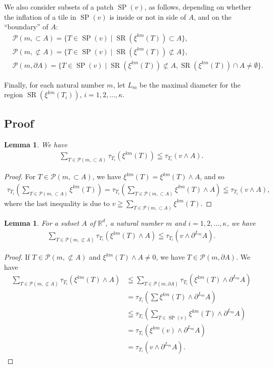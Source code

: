 \documentclass[a4]{amsart}
\DeclareMathOperator{\SP}{SP}
\DeclareMathOperator{\SR}{SR}
\newcommand{\sci}{\wedge}
\newtheorem{lem}[theorem]{Lemma}
\theoremstyle{definition}
\begin{document}
We also consider subsets of  a patch $\SP(v)$, as follows, depending on whether the inflation
of a tile in $\SP(v)$ is inside or not in side of $A$, and on the  ``boundary'' of $A$:
\begin{align*}
 &\mathcal{P}(m,\subset A)=\{T\in\SP(v)\mid \SR(\xi^{km}(T))\subset A\},\\
& \mathcal{P}(m,\not\subset A)=\{T\in\SP(v)\mid \SR(\xi^{km}(T))\not\subset A\},\\
& \mathcal{P}(m,\partial A)=\{T\in\SP(v)\mid \SR(\xi^{km}(T))\not\subset A, 
\SR(\xi^{km}(T))\cap A\neq \emptyset\}.
\end{align*}

Finally, for each natural number $m$, let $L_m$ be the maximal diameter for the
region $\SR(\xi^{km}(T_i))$, $i=1,2,\ldots ,\kappa$.

\subsection{Proof}
\begin{lem}
 We have
\begin{align*}
 \sum_{T\in\mathcal{P}(m,\subset A)}\tau_{T_i}(\xi^{km}(T))\leqq\tau_{T_i}(v\sci A).
\end{align*}
\end{lem}

\begin{proof}
 For $T\in\mathcal{P}(m,\subset A)$, we have $\xi^{km}(T)=\xi^{km}(T)\sci A$, and so
\begin{align*}
 \tau_{T_i}\left(\sum_{T\in\mathcal{P}(m,\subset A)}\xi^{km}(T)\right)
= \tau_{T_i}\left(\sum_{T\in\mathcal{P}(m,\subset A)}\xi^{km}(T)\sci A\right)\leqq\tau_{T_i}(v\sci A),
\end{align*}
where the last inequality is due to $v\geqq\sum_{T\in\mathcal{P}(m,\subset A)}\xi^{km}(T)$.
\end{proof}

\begin{lem}\label{lem1_appendix}
 For a subset $A$ of $\mathbb{R}^d$, a natural number $m$ and $i=1,2,\ldots ,\kappa$, we have
\begin{align*}
 \sum_{T\in\mathcal{P}(m,\not\subset A)}\tau_{T_i}(\xi^{km}(T)\sci A)\leqq\tau_{T_i}(v\sci\partial^{L_m}A).
\end{align*}
\end{lem}

\begin{proof}
 If $T\in\mathcal{P}(m,\not\subset A)$ and $\xi^{km}(T)\sci A\neq 0$, we have
$T\in\mathcal{P}(m,\partial A)$.  We have
\begin{align*}
 \sum_{T\in\mathcal{P}(m,\not\subset A)}\tau_{T_i}(\xi^{km}(T)\sci A)&
\leqq\sum_{T\in\mathcal{P}(m,\partial A)}\tau_{T_i}(\xi^{km}(T)\sci\partial^{L_m}A)\\
&=\tau_{T_i}\left(\sum\xi^{km}(T)\sci\partial^{L_m}A\right)\\
&\leqq\tau_{T_i}\left(\sum_{T\in\SP(v)}\xi^{km}(T)\sci\partial^{L_m}A\right)\\
&=\tau_{T_i}(\xi^{km}(v)\sci\partial^{L_m}A)\\
&=\tau_{T_i}(v\sci \partial^{L_m}A).
\end{align*}
\end{proof}
\end{document}
